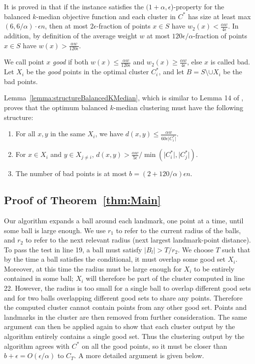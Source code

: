 \documentclass{llncs} \usepackage{algorithm}
\begin{document}
It is proved in \cite{bbg} that if the instance satisfies the $(1+\alpha,\epsilon$)-property for the balanced $k$-median objective function and each cluster in $C^{\ast}$ has size at least max$(6,6/\alpha) \cdot \epsilon n$, then at most $2 \epsilon$-fraction of points $x \in S$ have $w_{2}(x) < \frac{\alpha w}{4 \epsilon}$.  In addition, by definition of the average weight $w$ at most $120\epsilon / \alpha$-fraction of points $x \in S$ have $w(x) > \frac{\alpha w}{120 \epsilon}$.

We call point $x$ \emph{good} if both $w(x) \le \frac{\alpha w}{120 \epsilon}$ and $w_{2}(x) \ge \frac{\alpha w}{4 \epsilon}$, else $x$ is called bad.  Let $X_{i}$ be the \emph{good} points in the optimal cluster $C_{i}^{\ast}$, and let $B = S \setminus \cup X_{i}$ be the bad points.

Lemma~\ref{lemma:structureBalancedKMedian}, which is similar to Lemma 14 of \cite{bbg}, proves that the optimum balanced $k$-median clustering must have the following structure:
\begin{enumerate}
\item For all $x,y$ in the same $X_{i}$, we have $d(x,y) \le \frac{\alpha w}{60 \epsilon \vert C_{i}^{\ast} \vert}$.
\item For $x \in X_{i}$ and $y \in X_{j \ne i}$, $d(x,y) > \frac{\alpha w}{5 \epsilon}/ \min(\vert C_{i}^{\ast} \vert, \vert C_{j}^{\ast} \vert)$.
\item The number of bad points is at most $b=(2+120/\alpha)\epsilon n$.
\end{enumerate}

\subsection{Proof of Theorem~\ref{thm:Main}}

Our algorithm expands a ball around each landmark, one point at a time, until some ball is large enough.  We use $r_{1}$ to refer to the current radius of the balls, and $r_{2}$ to refer to the next relevant radius (next largest landmark-point distance).  To pass the test in line 19, a ball  must satisfy $\vert B_{l} \vert > T / r_{2}$.  We choose $T$ such that by the time a ball satisfies the conditional, it must overlap some good set $X_{i}$.  Moreover, at this time the radius must be large enough for $X_{i}$ to be entirely contained in some ball; $X_{i}$ will therefore be part of the cluster computed in line 22.  However, the radius is too small for a single ball to overlap different good sets and for two balls overlapping different good sets to share any points.  Therefore the computed cluster cannot contain points from any other good set.  Points and landmarks in the cluster are then removed from further consideration.  The same argument can then be applied again to show that each cluster output by the algorithm entirely contains a single good set.  Thus the clustering output by the algorithm agrees with $C^{\ast}$ on all the good points, so it must be closer than $b + \epsilon = O(\epsilon/\alpha)$ to $C_{T}$.  A more detailed argument is given below.
\end{document}
